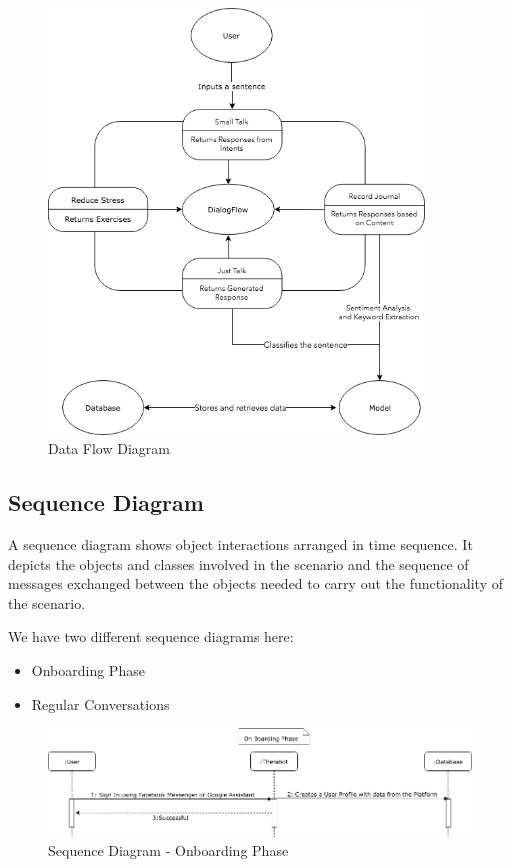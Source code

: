 \begin{figure}[H]
    \centering
    \includegraphics[width=10cm]{images/data-flow-diagram.png}
    \caption{Data Flow Diagram}
\end{figure}

\pagebreak

\subsection{Sequence Diagram}

A sequence diagram shows object interactions arranged in time sequence. It depicts the objects and classes involved in the scenario and the sequence of messages exchanged between the objects needed to carry out the functionality of the scenario.

We have two different sequence diagrams here:
\begin{itemize}
    \item Onboarding Phase
    \item Regular Conversations
\end{itemize}

\begin{figure}[H]
    \centering
    \includegraphics[width=\linewidth]{images/sequence-diagram-onboarding-phase.png}
    \caption{Sequence Diagram - Onboarding Phase}
\end{figure}


